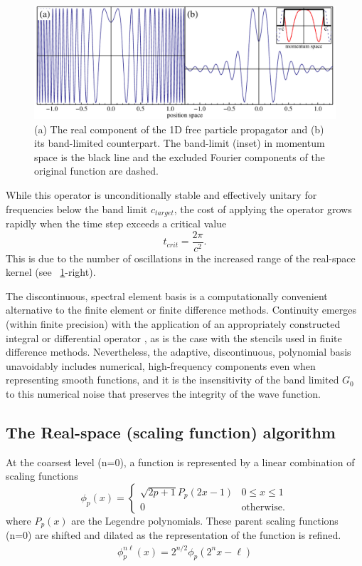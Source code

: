 \documentclass[review,letterpaper]{elsarticle}
\begin{document}
\begin{figure}[ht]
\centering
\includegraphics[width=4.5in]{freePP}
\caption{(a) The real component of the 1D free particle propagator and (b) its band-limited counterpart. The band-limit (inset) in momentum space is the black line and the excluded Fourier components of the original function are dashed. }
\label{F:g0}
\end{figure}

While this operator is unconditionally stable and effectively unitary for frequencies below the
band limit  $c_{target}$, the cost of applying the operator grows rapidly when the time step exceeds
a critical value
\begin{equation}
t_{crit}=\frac{2\pi }{c^{2}}.
\end{equation}
This is due to the number of oscillations in the increased range of the real-space kernel
(see \figurename~\ref{F:g0}-right).

The discontinuous, spectral element basis is a computationally convenient
alternative to the finite element or finite difference methods.
Continuity emerges (within finite precision) with the application
of an appropriately constructed integral or differential operator \cite{Alpert:2002cx},
as is the case with the stencils used in finite difference methods.
Nevertheless, the adaptive, discontinuous, polynomial basis unavoidably
includes numerical, high-frequency components even when representing
smooth functions, and it is the insensitivity of the band limited $G_0$ to this
numerical noise that preserves the integrity of the wave function.



\subsection{The Real-space (scaling function) algorithm}
\label{S:bandLimitedProp}

At the coarsest level (n=0), a function is represented by a linear combination of scaling functions
\begin{equation}
\phi _{p}(x)=\left\{\begin{matrix}\sqrt{2p+1}P_{p}(2x-1)&0\le x\le 1\\0&\textrm{otherwise.}\end{matrix}\right.
\end{equation}
where $P_p(x)$ are the Legendre polynomials.
These parent scaling functions (n=0) are shifted and dilated as the representation of the function is refined.
\begin{align}
\phi^{n \ell}_p(x) = 2^{n/2} \phi_p(2^n x-\ell)
\end{align}
\end{document}
